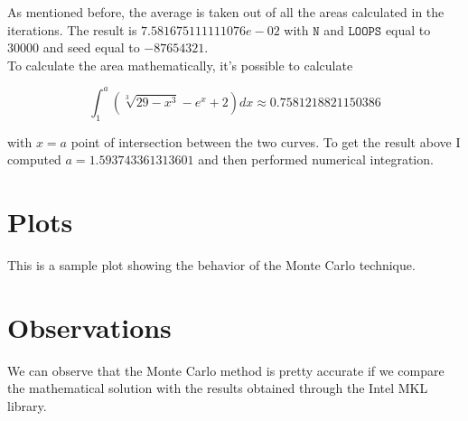 \documentclass{article}
\newcommand{\code}{\texttt}
\begin{document}
As mentioned before, the average is taken out of all the areas calculated in the iterations. The result is $7.581675111111076e-02$ with $\code{N}$ and $\code{LOOPS}$ equal to 30000 and seed equal to $-87654321$.\\

To calculate the area mathematically, it's possible to calculate

$$
\int_1^{a} (\sqrt[3]{29-x^3}-e^x+2)dx\approx 0.7581218821150386
$$

with $x=a$ point of intersection between the two curves. To get the result above I computed $a=1.593743361313601$ and then performed numerical integration.

\section{Plots}
This is a sample plot showing the behavior of the Monte Carlo technique.

\section{Observations}
We can observe that the Monte Carlo method is pretty accurate if we compare the mathematical solution with the results obtained through the Intel MKL library.
\end{document}
